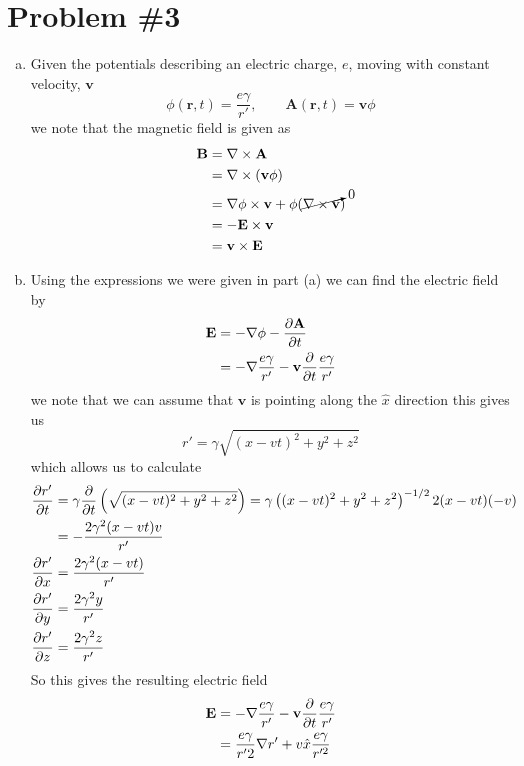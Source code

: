 \documentclass[11pt]{article}
\numberwithin{equation}{section}
\begin{document}
\section{Problem \#3}
\begin{enumerate}[(a)]
\item
    Given the potentials describing an electric charge, $e$, moving with constant velocity, $\mathbf{v}$ 
    $$\phi(\mathbf{r},t) = \frac{e\gamma}{r'},\qquad \mathbf{A}(\mathbf{r},t) = \mathbf{v}\phi$$
    we note that the magnetic field is given as
    \begin{align*}
        \mathbf{B} &= \bold\nabla\times\mathbf{A}\\
                   &= \bold\nabla\times(\mathbf{v}\phi)\\
                   &= \bold\nabla\phi\times\mathbf{v} + \phi(\cancelto{0}{\bold\nabla\times\mathbf{v}})\\
                   &= -\mathbf{E}\times\mathbf{v}\\
                   &= \mathbf{v}\times\mathbf{E}
    \end{align*}

\item
    Using the expressions we were given in part (a) we can find the electric field by
    \begin{align*}
        \mathbf{E} &= -\bold\nabla\phi - \frac{\partial{\mathbf{A}}}{\partial{t}}\\
                   &= -\bold\nabla\frac{e\gamma}{r'} - \mathbf{v}\frac{\partial{}}{\partial{t}}\frac{e\gamma}{r'}
    \end{align*}
    we note that we can assume that $\mathbf{v}$ is pointing along the $\hat{x}$ direction this gives us
    $$r' = \gamma\sqrt{(x-vt)^2+y^2+z^2}$$
    which allows us to calculate
    \begin{align*}
        \frac{\partial{r'}}{\partial{t}} &= \gamma\frac{\partial{}}{\partial{t}}\left(\sqrt{(x-vt)^2+y^2+z^2}\right) = \gamma\left((x-vt)^2+y^2+z^2\right)^{-1/2}2(x-vt)(-v)\\
                         &= -\frac{2\gamma^2(x-vt)v}{r'}\\
        \frac{\partial{r'}}{\partial{x}} &= \frac{2\gamma^2(x-vt)}{r'}\\
        \frac{\partial{r'}}{\partial{y}} &= \frac{2\gamma^2y}{r'}\\
        \frac{\partial{r'}}{\partial{z}} &= \frac{2\gamma^2z}{r'}
    \end{align*}
    So this gives the resulting electric field
    \begin{align*}
        \mathbf{E} &= -\bold\nabla\frac{e\gamma}{r'} - \mathbf{v}\frac{\partial{}}{\partial{t}}\frac{e\gamma}{r'}\\
        &= \frac{e\gamma}{r'2}\bold\nabla{r'} + v\hat{x}\frac{e\gamma}{r'^2}\\
    \end{align*}
    


\end{enumerate}
\end{document}
